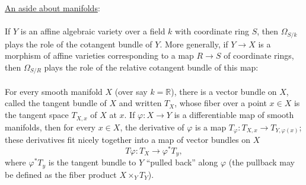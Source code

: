 \documentclass{beamer}
\begin{document}

\begin{frame}
\begin{small}
\underline{An aside about manifolds}:
\\\indent
\\If $Y$ is an affine algebraic variety over a field $k$ with coordinate ring $S$, then $\Omega_{S/k}$ plays the role of the cotangent bundle of $Y$. More generally, if $Y\to X$ is a morphism of affine varieties corresponding to a map $R\to S$ of coordinate rings, then $\Omega_{S/R}$ plays the role of the relative cotangent bundle of this map:  
\\\indent
\\ For every smooth manifold $X$ (over say $k = \mathbb{R}$), there is a vector bundle on $X$, called the tangent bundle of $X$ and written $T_X$, whose fiber over a point $x\in X$ is the tangent space $T_{X,x}$ of $X$ at $x$. If $\varphi:X\to Y$ is a differentiable map of smooth manifolds, then for every $x\in X$, the derivative of $\varphi$ is a map $T_{\varphi} :T_{X,x}\to T_{Y,\varphi(x)}$; these derivatives fit nicely together into a map of vector bundles on $X$
$$T\varphi: T_X\to \varphi^{*}T_y,$$
where $\varphi^{*}T_y$ is the tangent bundle to $Y$ ``pulled back'' along $\varphi$ (the pullback may be defined as the fiber product $X\times_YT_Y$).




\end{small}
\end{frame}

\end{document}
